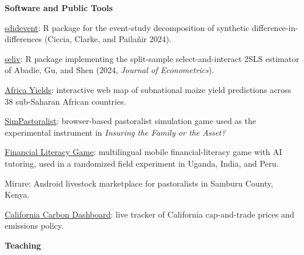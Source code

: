 \documentclass[11pt,letterpaper]{article}
\newcommand{\horse}{5pt} 	%
\newcommand{\littlehorse}{5pt}%
\newenvironment{itemize*}%
  {\begin{itemize}[topsep=0pt, partopsep=0pt, leftmargin=1.6em, itemindent=-1.6em, labelsep=0pt, labelwidth=0pt]%
    \setlength{\itemsep}{\littlehorse}%
    \setlength{\parskip}{0pt}%
    \interlinepenalty=10000}%
  {\end{itemize}\vspace{\horse}}
\newcommand{\resheading}[1]{%
  \vspace{6pt}%
  {\textbf{\large #1}}%
  \par\vspace{4pt}}
\begin{document}
\resheading{Software and Public Tools}
\begin{itemize*}

\item[]{\href{https://github.com/awhobbs/sdidevent}{sdidevent}: R package for the event-study decomposition of synthetic difference-in-differences (Ciccia, Clarke, and Paila\~{n}ir 2024).}

\item[]{\href{https://github.com/awhobbs/seliv}{seliv}: R package implementing the split-sample select-and-interact 2SLS estimator of Abadie, Gu, and Shen (2024, \textit{Journal of Econometrics}).}

\item[]{\href{https://hobbservations.com/africa-yields/}{Africa Yields}: interactive web map of subnational maize yield predictions across 38 sub-Saharan African countries.}

\item[]{\href{https://hobbservations.com/SimPastoralist/}{SimPastoralist}: browser-based pastoralist simulation game used as the experimental instrument in \textit{Insuring the Family or the Asset?}}

\item[]{\href{https://testfin-e8e9d.web.app/}{Financial Literacy Game}: multilingual mobile financial-literacy game with AI tutoring, used in a randomized field experiment in Uganda, India, and Peru.}

\item[]{Mirare: Android livestock marketplace for pastoralists in Samburu County, Kenya.}

\item[]{\href{https://hobbservations.com/carbon-dashboard/}{California Carbon Dashboard}: live tracker of California cap-and-trade prices and emissions policy.}

\end{itemize*}

\resheading{Teaching}
\end{document}
